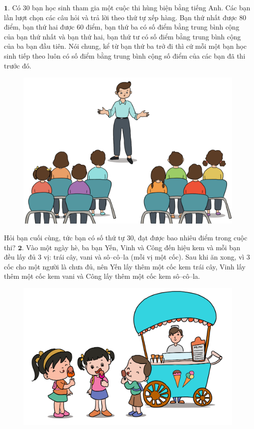 \begin{multicols}{2}
	$\pmb{1.}$ Có $30$ bạn học sinh tham gia một cuộc thi hùng biện bằng tiếng Anh. Các bạn lần lượt chọn các câu hỏi và trả lời theo thứ tự xếp hàng. Bạn thứ nhất được $80$ điểm, bạn thứ hai được $60$ điểm, bạn thứ ba có số điểm bằng trung bình cộng của bạn thứ nhất và bạn thứ hai, bạn thứ tư có số điểm bằng trung bình cộng của ba bạn đầu tiên. Nói chung, kể từ bạn thứ ba trở đi thì cứ mỗi một bạn học sinh tiếp theo luôn có số điểm bằng trung bình cộng số điểm của các bạn đã thi trước đó. 
	\begin{figure}[H]
		\centering
		\vspace*{-5pt}
		\captionsetup{labelformat= empty, justification=centering}
		\includegraphics[width=0.92\linewidth]{bai1}
	\end{figure}
	Hỏi bạn cuối cùng, tức bạn có số thứ tự $30$, đạt được bao nhiêu điểm trong cuộc thi? 
	\vskip 0.1cm
	$\pmb{2.}$ Vào một ngày hè, ba bạn Yến, Vinh và Công đến hiệu kem và mỗi bạn đều lấy đủ $3$ vị: trái cây, vani và sô--cô--la (mỗi vị một cốc). Sau khi ăn xong, vì $3$ cốc cho một người là chưa đủ, nên Yến lấy thêm một cốc kem trái cây, Vinh lấy thêm một cốc kem vani và Công lấy thêm một cốc kem sô--cô--la. 
	\begin{figure}[H]
		\centering
		\vspace*{-5pt}
		\captionsetup{labelformat= empty, justification=centering}
		\includegraphics[width=0.9\linewidth]{bai2}

\end{figure}
\end{multicols}
